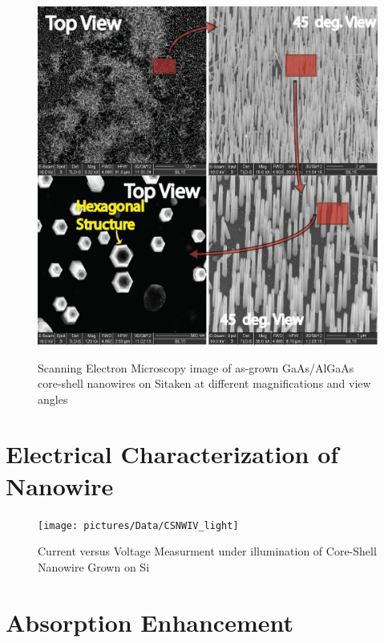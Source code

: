\begin{figure}
  \caption{Scanning Electron Microscopy image of as-grown GaAs/AlGaAs core-shell nanowires on Sitaken at different magnifications and view angles}
  \centering
  \includegraphics[width=\textwidth]{pictures/Data/SEMNW}
  \label{SEMNW}
\end{figure}

\section{Electrical Characterization of Nanowire}

\begin{figure}
  \caption{Current versus Voltage Measurment under illumination of Core-Shell Nanowire Grown on Si}
  \centering
  \texttt{[image: pictures/Data/CSNWIV\_light]}
  \label{CSNWIV_light}
\end{figure}

\section{Absorption Enhancement} \label{X-ray}

